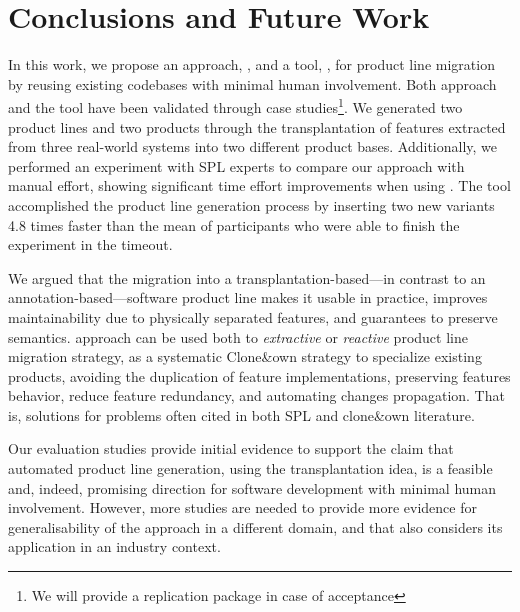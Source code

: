 \section{Conclusions and Future Work} \label{sec:conclusion_future_work} 

In this work, we propose an approach, \FOUNDRY, and a tool, \autoscalpel, for product line migration by reusing existing codebases with minimal human involvement. Both approach and the tool have been validated through case studies\footnote{We will provide a replication package in case of acceptance}. We generated two product lines and two products through the transplantation of features extracted from three real-world systems into two different product bases. Additionally, we performed an experiment with SPL experts to compare our approach with manual effort, showing significant time effort improvements when using \autoscalpel. The tool accomplished the product line generation process by inserting two new variants 4.8 times faster than the mean of participants who were able to finish the experiment in the timeout.

We argued that the migration into a transplantation-based—in contrast to an annotation-based—software product line makes it usable in practice, improves maintainability due to physically separated features, and guarantees to preserve semantics.  \FOUNDRY approach can be used both to \emph{extractive} or \emph{reactive} product line migration strategy, as a systematic Clone\&own strategy to specialize existing products, avoiding the duplication of feature implementations, preserving features behavior, reduce feature redundancy, and automating changes propagation. That is, solutions for problems often cited in both SPL and clone\&own literature.

Our evaluation studies provide initial evidence to support the claim that automated product line generation, using the transplantation idea, is a feasible and, indeed, promising direction for software development with minimal human involvement. However, more studies are needed to provide more evidence for generalisability of the approach in a different domain, and that also considers its application in an industry context.
